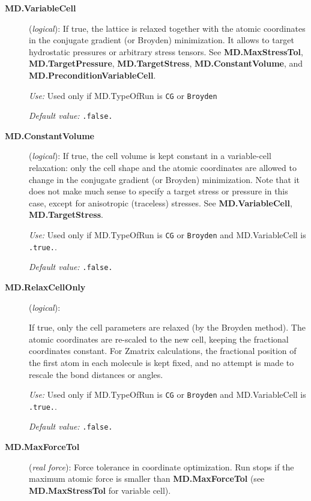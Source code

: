 \documentclass[11pt]{article}
\begin{document}
\begin{description}
\item[{\bf MD.VariableCell}] ({\it logical}):
 
If true, the lattice is relaxed together with the atomic coordinates
in the conjugate gradient (or Broyden) minimization. It allows to target
hydrostatic pressures or arbitrary stress tensors.  See {\bf
MD.MaxStressTol}, {\bf MD.TargetPressure}, {\bf MD.TargetStress}, {\bf
  MD.ConstantVolume}, and {\bf MD.PreconditionVariableCell}.

{\it Use:} Used only if MD.TypeOfRun is {\tt CG} or {\tt Broyden}

{\it Default value:} {\tt .false.}

\item[{\bf MD.ConstantVolume}] ({\it logical}):
If true, the cell volume is kept constant in a variable-cell
relaxation: only the cell shape and the atomic coordinates are allowed
to change in the conjugate gradient (or Broyden) minimization. 
Note that it does not make much sense to specify a target stress or
pressure in this case, except for anisotropic (traceless) stresses.
See {\bf MD.VariableCell}, {\bf MD.TargetStress}.

{\it Use:} Used only if MD.TypeOfRun is {\tt CG} or {\tt Broyden}  and
 MD.VariableCell is
 {\tt .true.}. 

{\it Default value:} {\tt .false.}

\item[{\bf MD.RelaxCellOnly}] ({\it logical}):
  

If true, only the cell parameters are relaxed
(by the Broyden method).  The atomic coordinates are re-scaled to the
new cell, keeping the fractional coordinates constant. For Zmatrix
calculations, the fractional position of the first atom in each
molecule is kept fixed, and no attempt is made to rescale the bond
distances or angles. 

{\it Use:} Used only if MD.TypeOfRun is {\tt CG} or {\tt Broyden}  and
 MD.VariableCell is
 {\tt .true.}. 

{\it Default value:} {\tt .false.}

\item[{\bf MD.MaxForceTol}] ({\it real force}): 
Force tolerance in coordinate optimization.  
Run stops if the maximum atomic force is
smaller than {\bf MD.MaxForceTol} (see {\bf MD.MaxStressTol}
for variable cell).


\end{description}
\end{document}
